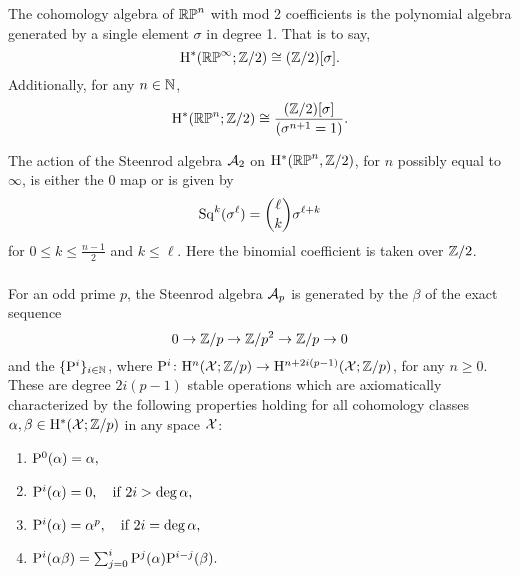 The cohomology algebra of $\mathbb{RP}^n$ with mod 2 coefficients is the polynomial algebra generated by a single element $\sigma$ in degree 1.
That is to say,
\[
\mathrm{H}^\ast(\mathbb{RP}^\infty; \mathbb{Z}/2) \cong (\mathbb{Z}/2)[\sigma].
\]
Additionally, for any $n \in \mathbb{N}$,
\[
\mathrm{H}^\ast(\mathbb{RP}^n; \mathbb{Z}/2) \cong \frac{(\mathbb{Z}/2)[\sigma]}{(\sigma^{n+1} = 1)}.
\]

The action of the Steenrod algebra $\mathcal{A}_2$ on $\mathrm{H}^*(\mathbb{RP}^n, \mathbb{Z}/2)$, for $n$ possibly equal to $\infty$, is either the 0 map or is given by
\[
\operatorname{Sq}^k(\sigma^\ell) = \binom{\ell}{k}\sigma^{\ell+k}
\]
for $0 \leq k \leq \frac{n-1}{2}$ and $k \leq \ell$.
Here the binomial coefficient is taken over \(\mathbb{Z}/2\).

\subsubsection{} For an odd prime \(p\), the Steenrod algebra $\mathcal{A}_p$ is generated by the  \(\beta\) of the exact sequence
\[
0 \to \mathbb{Z}/p \to \mathbb{Z}/p^2 \to \mathbb{Z}/p \to 0
\]
and the  \(\{\mathrm{P}^i\}_{i \in \mathbb{N}}\), where $\mathrm{P}^i \colon \mathrm{H}^n(\mathcal{X}; \mathbb{Z}/p) \to \mathrm{H}^{n+2i(p-1)}(\mathcal{X}; \mathbb{Z}/p)$, for any $n\geq 0$.
These are degree \(2i(p-1)\) stable operations which are axiomatically characterized by the following properties holding for all cohomology classes \(\alpha, \beta \in \mathrm{H}^*(\mathcal{X}; \mathbb{Z}/p)\) in any space \(\mathcal{X}\):

\begin{enumerate}
	\item \(\mathrm{P}^0(\alpha) = \alpha,\)
	\item \(\mathrm{P}^i(\alpha) = 0, \quad \text{if } 2i > \deg\alpha,\)
	\item \(\mathrm{P}^i(\alpha) = \alpha^p, \quad \text{if } 2i = \deg\alpha,\)
	\item \(\mathrm{P}^i(\alpha \beta) = \textstyle\sum_{j=0}^{i} \mathrm{P}^j(\alpha) \mathrm{P}^{i-j}(\beta).\)
\end{enumerate}

\subsubsection{}

